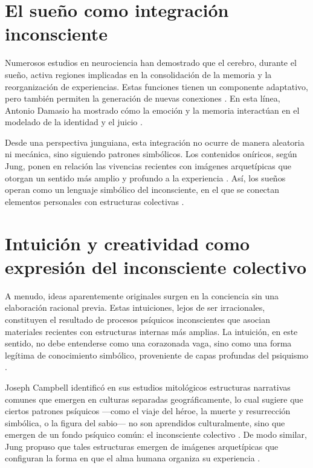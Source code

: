 \documentclass[a4paper,12pt]{article}
\begin{document}
\section*{El sueño como integración inconsciente}

Numerosos estudios en neurociencia han demostrado que el cerebro, durante el sueño, activa regiones implicadas en la consolidación de la memoria y la reorganización de experiencias. Estas funciones tienen un componente adaptativo, pero también permiten la generación de nuevas conexiones \cite{damasio1999,eagleman2011}. En esta línea, Antonio Damasio ha mostrado cómo la emoción y la memoria interactúan en el modelado de la identidad y el juicio \cite{damasio1999}.

Desde una perspectiva junguiana, esta integración no ocurre de manera aleatoria ni mecánica, sino siguiendo patrones simbólicos. Los contenidos oníricos, según Jung, ponen en relación las vivencias recientes con imágenes arquetípicas que otorgan un sentido más amplio y profundo a la experiencia \cite{jung1959}. Así, los sueños operan como un lenguaje simbólico del inconsciente, en el que se conectan elementos personales con estructuras colectivas \cite{jung1959,jung1964}.


\section*{Intuición y creatividad como expresión del inconsciente colectivo}

A menudo, ideas aparentemente originales surgen en la conciencia sin una elaboración racional previa. Estas intuiciones, lejos de ser irracionales, constituyen el resultado de procesos psíquicos inconscientes que asocian materiales recientes con estructuras internas más amplias. La intuición, en este sentido, no debe entenderse como una corazonada vaga, sino como una forma legítima de conocimiento simbólico, proveniente de capas profundas del psiquismo \cite{jung1959,jung1971}.

Joseph Campbell identificó en sus estudios mitológicos estructuras narrativas comunes que emergen en culturas separadas geográficamente, lo cual sugiere que ciertos patrones psíquicos —como el viaje del héroe, la muerte y resurrección simbólica, o la figura del sabio— no son aprendidos culturalmente, sino que emergen de un fondo psíquico común: el inconsciente colectivo \cite{campbell1949}. De modo similar, Jung propuso que tales estructuras emergen de imágenes arquetípicas que configuran la forma en que el alma humana organiza su experiencia \cite{jung1964}.
\end{document}
